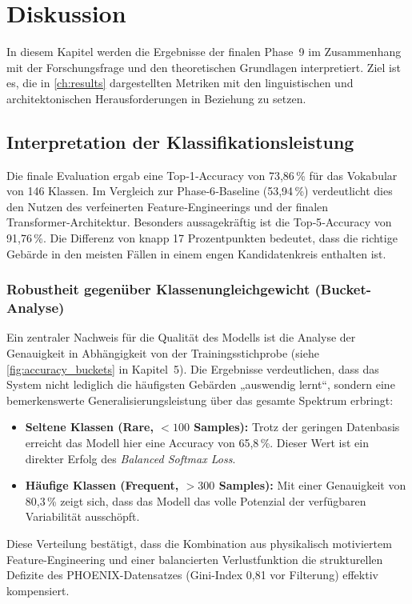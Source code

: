 \chapter{Diskussion}
\label{ch:discussion}

In diesem Kapitel werden die Ergebnisse der finalen Phase~9 im Zusammenhang mit der Forschungsfrage und den theoretischen Grundlagen interpretiert. Ziel ist es, die in \autoref{ch:results} dargestellten Metriken mit den linguistischen und architektonischen Herausforderungen in Beziehung zu setzen.

\section{Interpretation der Klassifikationsleistung}
Die finale Evaluation ergab eine Top‑1‑Accuracy von 73,86\,\% für das Vokabular von 146 Klassen. Im Vergleich zur Phase‑6‑Baseline (53,94\,\%) verdeutlicht dies den Nutzen des verfeinerten Feature‑Engineerings und der finalen Transformer‑Architektur.
Besonders aussagekräftig ist die Top‑5‑Accuracy von 91,76\,\%. Die Differenz von knapp 17 Prozentpunkten bedeutet, dass die richtige Gebärde in den meisten Fällen in einem engen Kandidatenkreis enthalten ist.

\subsection{Robustheit gegenüber Klassenungleichgewicht (Bucket-Analyse)}
Ein zentraler Nachweis für die Qualität des Modells ist die Analyse der Genauigkeit in Abhängigkeit von der Trainingsstichprobe (siehe \autoref{fig:accuracy_buckets} in Kapitel~5). Die Ergebnisse verdeutlichen, dass das System nicht lediglich die häufigsten Gebärden „auswendig lernt“, sondern eine bemerkenswerte Generalisierungsleistung über das gesamte Spektrum erbringt:

\begin{itemize}
    \item \textbf{Seltene Klassen (Rare, $< 100$ Samples):} Trotz der geringen Datenbasis erreicht das Modell hier eine Accuracy von 65{,}8\,\%. Dieser Wert ist ein direkter Erfolg des \textit{Balanced Softmax Loss}.
    \item \textbf{Häufige Klassen (Frequent, $> 300$ Samples):} Mit einer Genauigkeit von 80{,}3\,\% zeigt sich, dass das Modell das volle Potenzial der verfügbaren Variabilität ausschöpft.
\end{itemize}

Diese Verteilung bestätigt, dass die Kombination aus physikalisch motiviertem Feature-Engineering und einer balancierten Verlustfunktion die strukturellen Defizite des PHOENIX-Datensatzes (Gini-Index 0{,}81 vor Filterung) effektiv kompensiert.


